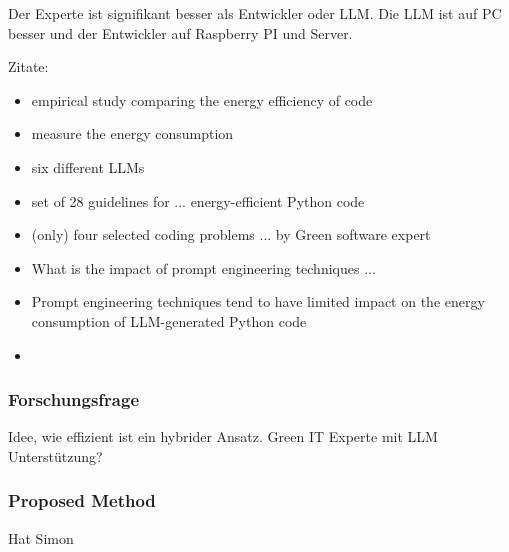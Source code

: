 \documentclass[a4paper]{article}
\begin{document}
Der Experte ist signifikant besser als Entwickler oder LLM. Die LLM ist auf PC besser und der Entwickler auf Raspberry PI und Server.

Zitate:

\begin{itemize}
    \item empirical study comparing the energy efficiency of code
    \item measure the energy consumption
    \item six different LLMs
    \item set of 28 guidelines for ... energy-efficient Python code
    \item (only) four selected coding problems ... by Green software expert
    \item What is the impact of prompt engineering techniques ...
    \item Prompt engineering techniques tend to have limited impact on the energy consumption of LLM-generated Python code
    \item 
\end{itemize}


\subsubsection{Forschungsfrage}

Idee, wie effizient ist ein hybrider Ansatz. Green IT Experte mit LLM Unterstützung?

\subsubsection{Proposed Method}

Hat Simon
\end{document}
